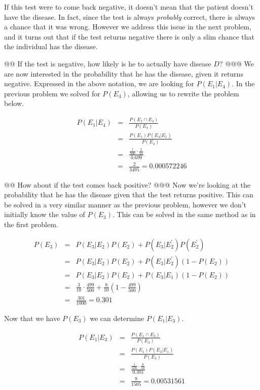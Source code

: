 \documentclass[10pt]{article}
\begin{document}
\begin{easylist}[enumerate]
    If this test were to come back negative, it doesn't mean that the patient doesn't have the disease. In fact, since
    the test is always \textit{probably} correct, there is always a chance that it was wrong. However we address this
    issue in the next problem, and it turns out that if the test returns negative there is only a slim chance that the
    individual has the disease.

    @@ If the test is negative, how likely is he to actually have disease $D$?
    @@@ We are now interested in the probability that he has the disease, given it returns negative. Expressed in the
    above notation, we are looking for $P(E_1|E_4)$. In the previous problem we solved for $P(E_4)$, allowing us to
    rewrite the problem below.

        \[\begin{aligned}
            P(E_1|E_4) &=& \frac{P(E_1 \cap E_4)}{P(E_4)}\\
                       &=& \frac{P(E_1)P(E_4|E_1)}{P(E_4)}\\
                       &=& \frac{\frac{1}{500} \cdot \frac{2}{10}}{0.699}\\
                       &=& \frac{2}{3495} = \boxed{0.000572246}
        \end{aligned}\]

    @@ How about if the test comes back positive?
    @@@ Now we're looking at the probability that he has the disease given that the test returns positive. This can be
    solved in a very similar manner as the previous problem, however we don't initially know the value of $P(E_3)$. This
    can be solved in the same method as in the first problem.

        \[ \begin{aligned}
            P(E_3) &=& P(E_3|E_2)P(E_2) + P(E_3|E^\prime_2)P(E^\prime_2)\\
                   &=& P(E_3|E_2)P(E_2) + P(E_3|E^\prime_2)(1 - P(E_2))\\
                   &=& P(E_3|E_2)P(E_2) + P(E_3|E_1)(1 - P(E_2))\\
                   &=& \frac{3}{10} \cdot \frac{499}{500} + \frac{8}{10} \left( 1 - \frac{499}{500} \right)\\
                   &=& \frac{301}{1000} = \boxed{0.301}
        \end{aligned} \]

        Now that we have $P(E_3)$ we can determine $P(E_1|E_3)$.

        \[\begin{aligned}
            P(E_1|E_3) &=& \frac{P(E_1 \cap E_3)}{P(E_3)}\\
                       &=& \frac{P(E_1)P(E_3|E_1)}{P(E_3)}\\
                       &=& \frac{\frac{1}{500} \cdot \frac{8}{10}}{0.301}\\
                       &=& \frac{8}{1505} = \boxed{0.00531561}
        \end{aligned}\]


\end{easylist}
\end{document}
